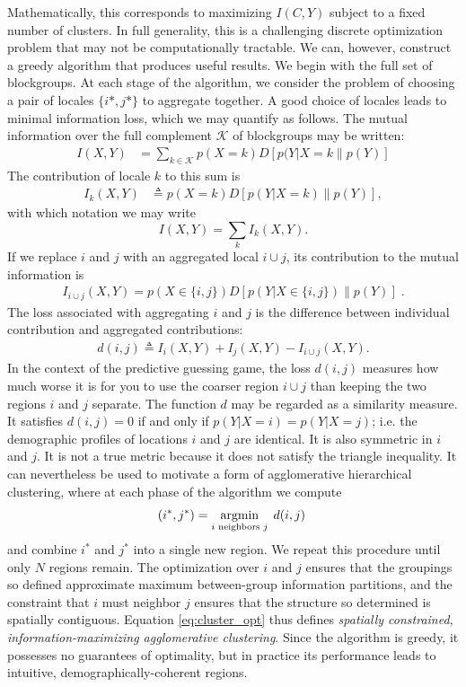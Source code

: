 \documentclass[english]{scrartcl}
\begin{document}
	Mathematically, this corresponds to maximizing $I(C,Y)$ subject to a fixed number of clusters. In full generality, this is a challenging discrete optimization problem that may not be computationally tractable. We can, however, construct a greedy algorithm that produces useful results. We begin with the full set of blockgroups. At each stage of the algorithm, we consider the problem of choosing a pair of locales $\{i*, j*\}$ to aggregate together. A good choice of locales leads to minimal information loss, which we may quantify as follows. The mutual information over the full complement $\mathcal{K}$ of blockgroups may be written: 
	\begin{align*}
	 	I(X,Y) &= \sum_{k \in \mathcal{K}} p(X = k) D[p(Y|X = k\|p(Y)] 
	\end{align*} 
	The contribution of locale $k$ to this sum is 
	\begin{align*}
		I_{k}(X,Y) &\triangleq p(X = k)D[p(Y|X = k)\|p(Y)], 
	\end{align*}
	with which notation we may write 
	\begin{equation*}
		I(X,Y) = \sum_{k} I_k(X,Y).
	\end{equation*}
	If we replace $i$ and $j$ with an aggregated local $i\cup j$, its contribution to the mutual information is 
	\begin{align*}
		I_{i\cup j}(X,Y) = p(X \in \{i,j\}) D[p(Y|X \in \{i,j\}) \| p(Y)]\;.
	\end{align*}
	The loss associated with aggregating $i$ and $j$ is the difference between individual contribution and  aggregated contributions:
	\begin{align*}
		d(i,j) \triangleq I_{i}(X,Y) + I_{j}(X,Y) - I_{i \cup j}(X,Y).  
	\end{align*}
	In the context of the predictive guessing game, the loss $d(i,j)$ measures how much worse it is for you to use the coarser region $i\cup j$ than keeping the two regions $i$ and $j$ separate. The function $d$ may be regarded as a similarity measure. It satisfies $d(i,j) = 0$ if and only if $p(Y|X = i) = p(Y|X = j)$; i.e. the demographic profiles of locations $i$ and $j$ are identical. It is also symmetric in $i$ and $j$. It is not a true metric because it does not satisfy the triangle inequality. It can nevertheless be used to motivate a form of agglomerative hierarchical clustering, where at each phase of the algorithm we compute 
	\begin{equation}
		(i^*, j^*) = \argmin_{i \text{ neighbors } j} \; d(i,j)\; \label{eq:cluster_opt}
	\end{equation}
	and combine $i^*$ and $j^*$ into a single new region. We repeat this procedure until only $N$ regions remain. The optimization over $i$ and $j$ ensures that the groupings so defined approximate maximum between-group information partitions, and the constraint that $i$ must neighbor $j$ ensures that the structure so determined is spatially contiguous. Equation \eqref{eq:cluster_opt} thus defines \emph{spatially constrained, information-maximizing agglomerative clustering}. Since the algorithm is greedy, it possesses no guarantees of optimality, but in practice its performance leads to intuitive, demographically-coherent regions. 
\end{document}

